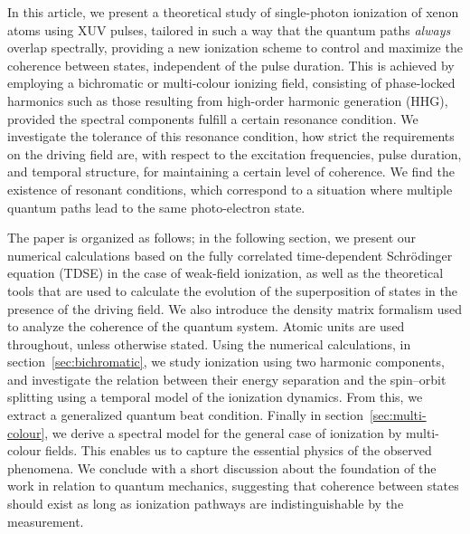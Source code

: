 In this article, we present a theoretical study of single-photon
ionization of xenon atoms using XUV pulses, tailored in such a way
that the quantum paths \emph{always} overlap spectrally, providing a
new ionization scheme to control and maximize the coherence between
states, independent of the pulse duration. This is achieved by
employing a bichromatic or multi-colour ionizing field, consisting of
phase-locked harmonics such as those resulting from high-order
harmonic generation (HHG), provided the spectral components fulfill a
certain resonance condition. We investigate the tolerance of this
resonance condition, \ie how strict the requirements on the driving
field are, with respect to the excitation frequencies, pulse duration,
and temporal structure, for maintaining a certain level of
coherence. We find the existence of resonant conditions, which
correspond to a situation where multiple quantum paths lead to the
same photo-electron state.

The paper is organized as follows; in the following section, we
present our numerical calculations based on the fully correlated
time-dependent Schrödinger equation (TDSE) in the case of weak-field
ionization, as well as the theoretical tools that are used to
calculate the evolution of the superposition of states in the presence
of the driving field. We also introduce the density matrix formalism
used to analyze the coherence of the quantum system. Atomic units are
used throughout, unless otherwise stated. Using the numerical
calculations, in section~\ref{sec:bichromatic}, we study ionization
using two harmonic components, and investigate the relation between
their energy separation and the spin--orbit splitting using a temporal
model of the ionization dynamics. From this, we extract a generalized
quantum beat condition. Finally in section~\ref{sec:multi-colour}, we
derive a spectral model for the general case of ionization by
multi-colour fields. This enables us to capture the essential physics
of the observed phenomena. We conclude with a short discussion about
the foundation of the work in relation to quantum mechanics,
suggesting that coherence between states should exist as long as
ionization pathways are indistinguishable by the measurement.
